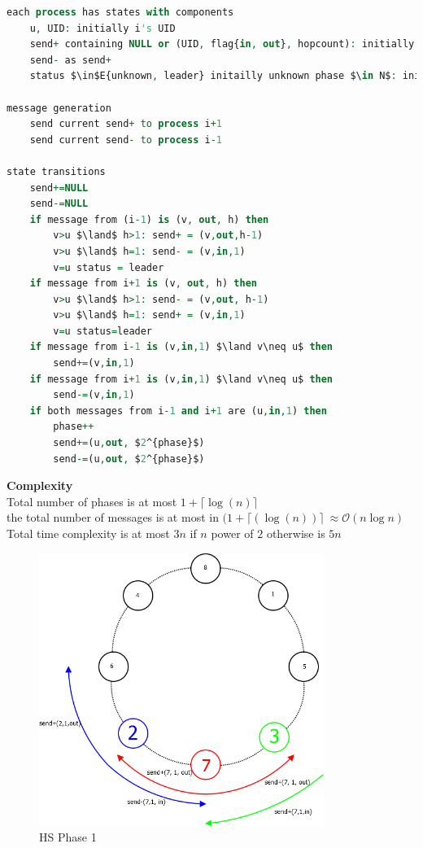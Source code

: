 \begin{lstlisting}[mathescape, language=VHDL]
each process has states with components
	u, UID: initially i's UID
	send+ containing NULL or (UID, flag{in, out}, hopcount): initially (i's UID, out, 1)
	send- as send+
	status $\in$E{unknown, leader} initailly unknown phase $\in N$: initially 0

message generation
	send current send+ to process i+1
	send current send- to process i-1

state transitions
	send+=NULL
	send-=NULL
	if message from (i-1) is (v, out, h) then
		v>u $\land$ h>1: send+ = (v,out,h-1)
		v>u $\land$ h=1: send- = (v,in,1)
		v=u status = leader
	if message from i+1 is (v, out, h) then
		v>u $\land$ h>1: send- = (v,out, h-1)
		v>u $\land$ h=1: send+ = (v,in,1)
		v=u status=leader
	if message from i-1 is (v,in,1) $\land v\neq u$ then
		send+=(v,in,1)
	if message from i+1 is (v,in,1) $\land v\neq u$ then
		send-=(v,in,1)
	if both messages from i-1 and i+1 are (u,in,1) then
		phase++
		send+=(u,out, $2^{phase}$)
		send-=(u,out, $2^{phase}$)
\end{lstlisting}
\textbf{Complexity}\\
Total number of phases is at most $1+\lceil\log(n)\rceil$\\
the total number of messages is at most in $(1+\lceil(\log(n))\rceil\ \approx \mathcal{O}(n\log n)$\\
Total time complexity is at most $3n$ if $n$ power of $2$ otherwise is $5n$\\

\begin{figure}[h]
	\centering
	\includegraphics[width=350px]{gfx/HS_p1.png}
	\caption{HS Phase 1}
	\label{img:hs_p1}
\end{figure}

